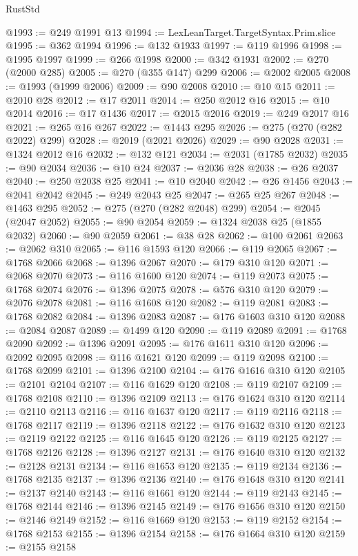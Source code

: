 \begin{lexlean}{RustStd}
\begin{coremodule}
@1993 := @249 @1991 @13
@1994 := LexLeanTarget.TargetSyntax.Prim.slice
@1995 := @362 @1994
@1996 := @132 @1933
@1997 := @119 @1996
@1998 := @1995 @1997
@1999 := @266 @1998
@2000 := @342 @1931
@2002 := @270 (@2000 @285)
@2005 := @270 (@355 @147) @299
@2006 := @2002 @2005
@2008 := @1993 (@1999 @2006)
@2009 := @90 @2008
@2010 := @10 @15
@2011 := @2010 @28
@2012 := @17 @2011
@2014 := @250 @2012 @16
@2015 := @10 @2014
@2016 := @17 @1436
@2017 := @2015 @2016
@2019 := @249 @2017 @16
@2021 := @265 @16 @267
@2022 := @1443 @295
@2026 := @275 (@270 (@282 @2022) @299)
@2028 := @2019 (@2021 @2026)
@2029 := @90 @2028
@2031 := @1324 @2012 @16
@2032 := @132 @121
@2034 := @2031 (@1785 @2032)
@2035 := @90 @2034
@2036 := @10 @24
@2037 := @2036 @28
@2038 := @26 @2037
@2040 := @250 @2038 @25
@2041 := @10 @2040
@2042 := @26 @1456
@2043 := @2041 @2042
@2045 := @249 @2043 @25
@2047 := @265 @25 @267
@2048 := @1463 @295
@2052 := @275 (@270 (@282 @2048) @299)
@2054 := @2045 (@2047 @2052)
@2055 := @90 @2054
@2059 := @1324 @2038 @25 (@1855 @2032)
@2060 := @90 @2059
@2061 := @38 @28
@2062 := @100 @2061
@2063 := @2062 @310
@2065 := @116 @1593 @120
@2066 := @119 @2065
@2067 := @1768 @2066
@2068 := @1396 @2067
@2070 := @179 @310 @120
@2071 := @2068 @2070
@2073 := @116 @1600 @120
@2074 := @119 @2073
@2075 := @1768 @2074
@2076 := @1396 @2075
@2078 := @576 @310 @120
@2079 := @2076 @2078
@2081 := @116 @1608 @120
@2082 := @119 @2081
@2083 := @1768 @2082
@2084 := @1396 @2083
@2087 := @176 @1603 @310 @120
@2088 := @2084 @2087
@2089 := @1499 @120
@2090 := @119 @2089
@2091 := @1768 @2090
@2092 := @1396 @2091
@2095 := @176 @1611 @310 @120
@2096 := @2092 @2095
@2098 := @116 @1621 @120
@2099 := @119 @2098
@2100 := @1768 @2099
@2101 := @1396 @2100
@2104 := @176 @1616 @310 @120
@2105 := @2101 @2104
@2107 := @116 @1629 @120
@2108 := @119 @2107
@2109 := @1768 @2108
@2110 := @1396 @2109
@2113 := @176 @1624 @310 @120
@2114 := @2110 @2113
@2116 := @116 @1637 @120
@2117 := @119 @2116
@2118 := @1768 @2117
@2119 := @1396 @2118
@2122 := @176 @1632 @310 @120
@2123 := @2119 @2122
@2125 := @116 @1645 @120
@2126 := @119 @2125
@2127 := @1768 @2126
@2128 := @1396 @2127
@2131 := @176 @1640 @310 @120
@2132 := @2128 @2131
@2134 := @116 @1653 @120
@2135 := @119 @2134
@2136 := @1768 @2135
@2137 := @1396 @2136
@2140 := @176 @1648 @310 @120
@2141 := @2137 @2140
@2143 := @116 @1661 @120
@2144 := @119 @2143
@2145 := @1768 @2144
@2146 := @1396 @2145
@2149 := @176 @1656 @310 @120
@2150 := @2146 @2149
@2152 := @116 @1669 @120
@2153 := @119 @2152
@2154 := @1768 @2153
@2155 := @1396 @2154
@2158 := @176 @1664 @310 @120
@2159 := @2155 @2158

\end{coremodule}
\end{lexlean}
